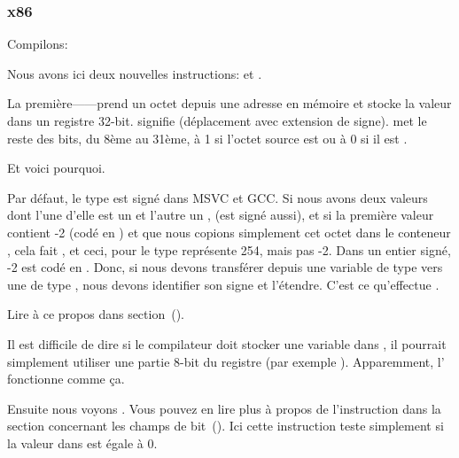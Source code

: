 \subsubsection{x86}


Compilons:




Nous avons ici deux nouvelles instructions: \MOVSX et \TEST.

\label{MOVSX}

La première---\MOVSX---prend un octet depuis une adresse en mémoire et stocke la
valeur dans un registre 32-bit. 
\MOVSX signifie  (déplacement avec extension de signe).
\MOVSX met le reste des bits, du 8ème au 31ème, à 1 si l'octet source est 
ou à 0 si il est .

Et voici pourquoi.

Par défaut, le type \Tchar est signé dans MSVC et GCC. Si nous avons deux valeurs
dont l'une d'elle est un \Tchar et l'autre un \Tint, (\Tint est signé aussi), et
si la première valeur contient -2 (codé en ) et que nous copions simplement
cet octet dans le conteneur \Tint, cela fait , et ceci, pour le type
\Tint représente 254, mais pas -2. Dans un entier signé, -2 est codé en .
Donc, si nous devons transférer  depuis une variable de type \Tchar vers
une de type \Tint, nous devons identifier son signe et l'étendre. C'est ce qu'effectue
\MOVSX.

Lire à ce propos dans \q{\IT{\SignedNumbersSectionName}} section~().

Il est difficile de dire si le compilateur doit stocker une variable \Tchar dans
\EDX, il pourrait simplement utiliser une partie 8-bit du registre (par exemple \DL).
Apparemment, l' fonctionne comme
ça.


Ensuite nous voyons .
Vous pouvez en lire plus à propos de l'instruction \TEST dans la section concernant
les champs de bit~().
Ici cette instruction teste simplement si la valeur dans \EDX est égale à 0.


